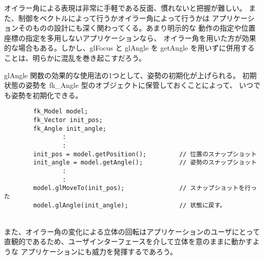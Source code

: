 オイラー角による表現は非常に手軽である反面、慣れないと把握が難しい。
また、制御をベクトルによって行うかオイラー角によって行うかは
アプリケーションそのものの設計にも深く関わってくる。あまり明示的な
動作の指定や位置座標の指定を多用しないアプリケーションなら、
オイラー角を用いた方が効果的な場合もある。しかし、glFocus と
glAngle を getAngle を用いずに併用することは、明らかに混乱を巻き起こすだろう。

glAngle 関数の効果的な使用法の1つとして、姿勢の初期化が上げられる。
初期状態の姿勢を fk\_Angle 型のオブジェクトに保管しておくことによって、
いつでも姿勢を初期化できる。
\\
\begin{breakbox}
\begin{verbatim}
        fk_Model model;
        fk_Vector init_pos;
        fk_Angle init_angle;
                :
                :
        init_pos = model.getPosition();         // 位置のスナップショット
        init_angle = model.getAngle();          // 姿勢のスナップショット
                :
                :
        model.glMoveTo(init_pos);               // スナップショットを行った
        model.glAngle(init_angle);              // 状態に戻す。
\end{verbatim}
\end{breakbox}
~ \\
また、オイラー角の変化による立体の回転はアプリケーションのユーザにとって
直観的であるため、ユーザインターフェースを介して立体を意のままに動かすような
アプリケーションにも威力を発揮するであろう。
